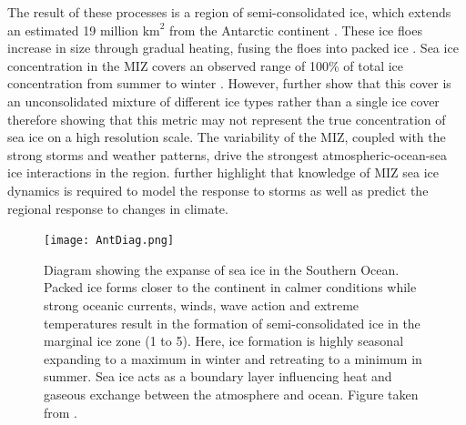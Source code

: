 The result of these processes is a region of semi-consolidated ice, which extends an estimated 19 million $\text{km}^2$ from the Antarctic continent \cite{MAKSYM2012seaiceextent}. These ice floes increase in size through gradual heating, fusing the floes into packed ice \cite{arrigo2004large}. Sea ice concentration in the MIZ covers an observed range of 100\% of total ice concentration from summer to winter \cite{alberello2019drift}. However, \textcite{alberello2019drift} further show that this cover is an unconsolidated mixture of different ice types rather than a single ice cover therefore showing that this metric may not represent the true concentration of sea ice on a high resolution scale. The variability of the MIZ, coupled with the strong storms and weather patterns, drive the strongest atmospheric-ocean-sea ice interactions in the region. \textcite{alberello2019drift} further highlight that knowledge of MIZ sea ice dynamics is required to model the response to storms as well as predict the regional response to changes in climate.

\begin{figure}[H]
	\centering
	\texttt{[image: AntDiag.png]}
	\caption{Diagram showing the expanse of sea ice in the Southern Ocean. Packed ice forms closer to the continent in calmer conditions while strong oceanic currents, winds, wave action and extreme temperatures result in the formation of semi-consolidated ice in the marginal ice zone (1 to 5). Here, ice formation is highly seasonal expanding to a maximum in winter and retreating to a minimum in summer. Sea ice acts as a boundary layer influencing heat and gaseous  exchange between the atmosphere and ocean. Figure taken from \textcite{Antseaice}.}
	\label{fig:AntaDiag}
\end{figure}


